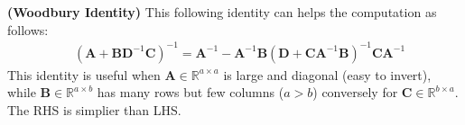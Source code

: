 \begin{proposition}{\textbf{(Woodbury Identity)}}
    This following identity can helps the computation as follows:
    \begin{equation*}
    \begin{aligned}
        &(\boldsymbol A+\boldsymbol B\boldsymbol D^{-1}\boldsymbol C)^{-1} = \boldsymbol A^{-1}-\boldsymbol A^{-1}\boldsymbol B(\boldsymbol D+\boldsymbol C\boldsymbol A^{-1}\boldsymbol B)^{-1}\boldsymbol C\boldsymbol A^{-1}
    \end{aligned}
    \end{equation*}
    This identity is useful when $\boldsymbol A \in \mathbb{R}^{a\times a}$ is large and diagonal (easy to invert), while $\boldsymbol B \in \mathbb{R}^{a \times b}$ has many rows but few columns ($a > b$) conversely for $\boldsymbol C \in \mathbb{R}^{b \times a}$. The RHS is simplier than LHS. 
\end{proposition}
